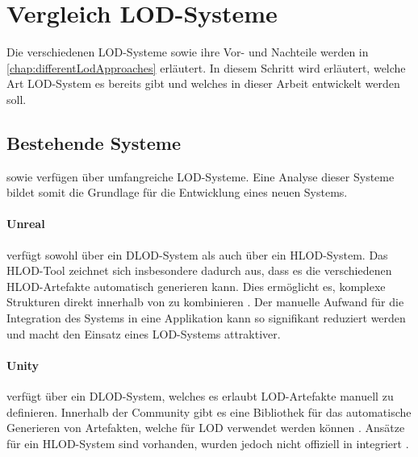 \section{Vergleich LOD-Systeme}
Die verschiedenen LOD-Systeme sowie ihre Vor- und Nachteile werden in \autoref{chap:differentLodApproaches} erläutert. In diesem Schritt wird erläutert, welche Art LOD-System es bereits gibt und welches in dieser Arbeit entwickelt werden soll.

\subsection{Bestehende Systeme}
\label{chap:existingSolutions}

 sowie  verfügen über umfangreiche LOD-Systeme. Eine Analyse dieser Systeme bildet somit die Grundlage für die Entwicklung eines neuen Systems.

\paragraph{Unreal}

 verfügt sowohl über ein DLOD-System als auch über ein HLOD-System. Das HLOD-Tool zeichnet sich insbesondere dadurch aus, dass es die verschiedenen HLOD-Artefakte automatisch generieren kann. Dies ermöglicht es, komplexe Strukturen direkt innerhalb von  zu kombinieren \cite{unrealProxyLod}. Der manuelle Aufwand für die Integration des Systems in eine Applikation kann so signifikant reduziert werden und macht den Einsatz eines LOD-Systems attraktiver.


\paragraph{Unity}

 verfügt über ein DLOD-System, welches es erlaubt LOD-Artefakte manuell zu definieren.
Innerhalb der  Community gibt es eine Bibliothek für das automatische Generieren von Artefakten, welche für LOD verwendet werden können \cite{unityMeshSimplification}.
Ansätze für ein HLOD-System sind vorhanden, wurden jedoch nicht offiziell in  integriert \cite{unityAutoLod}.

